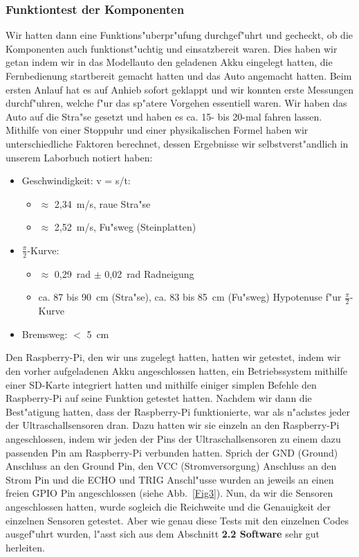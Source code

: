 \documentclass[a4paper,12pt]{article}
\newenvironment{smallitemize}{
	\begin{itemize}
		\setlength{\itemsep}{0pt}
		\setlength{\parskip}{0pt}
		\setlength{\parsep}{0pt}
}
{
	\end{itemize}
}
\begin{document}
\subsubsection{Funktiontest der Komponenten}\label{sec2.1.2}

Wir hatten dann eine Funktions"uberpr"ufung durchgef"uhrt und gecheckt, ob die Komponenten auch funktionst"uchtig und einsatzbereit waren.
Dies haben wir getan indem wir in das Modellauto den geladenen Akku eingelegt hatten, die Fernbedienung startbereit gemacht hatten und das Auto angemacht hatten.
Beim ersten Anlauf hat es auf Anhieb sofort geklappt und wir konnten erste Messungen durchf"uhren, welche f"ur das sp"atere Vorgehen essentiell waren.
Wir haben das Auto auf die Stra"se gesetzt und haben es ca. 15- bis 20-mal fahren lassen.
Mithilfe von einer Stoppuhr und einer physikalischen Formel haben wir unterschiedliche Faktoren berechnet, dessen Ergebnisse wir selbstverst"andlich in unserem Laborbuch notiert haben:

\begin{smallitemize}
	\item Geschwindigkeit: v = s/t:
	\begin{smallitemize}
		\item $ \approx $ 2,34~m/s, raue Stra"se
		\item $ \approx $ 2,52~m/s, Fu"sweg (Steinplatten)
	\end{smallitemize}
	\item $ \frac{\pi}{2} $-Kurve:
	\begin{smallitemize}
		\item $ \approx $ 0,29~rad $ \pm $ 0,02~rad Radneigung
		\item ca. 87 bis 90~cm (Stra"se), ca. 83 bis 85~cm (Fu"sweg) Hypotenuse f"ur $ \frac{\pi}{2} $-Kurve
	\end{smallitemize}
	\item Bremsweg: $ < $ 5~cm
\end{smallitemize}

Den Raspberry-Pi, den wir uns zugelegt hatten, hatten wir getestet, indem wir den vorher aufgeladenen Akku angeschlossen hatten, ein Betriebssystem mithilfe einer SD-Karte integriert hatten und mithilfe einiger simplen Befehle den Raspberry-Pi auf seine Funktion getestet hatten. 
Nachdem wir dann die Best"atigung hatten, dass der Raspberry-Pi funktionierte, war als n"achstes jeder der Ultraschallsensoren dran.
Dazu hatten wir sie einzeln an den Raspberry-Pi angeschlossen, indem wir jeden der Pins der Ultraschallsensoren zu einem dazu passenden Pin am Raspberry-Pi verbunden hatten.
Sprich der GND (Ground) Anschluss an den Ground Pin, den VCC (Stromversorgung) Anschluss an den Strom Pin und die ECHO und TRIG Anschl"usse wurden an jeweils an einen freien GPIO Pin angeschlossen (siehe Abb.~\ref{Fig3}).
Nun, da wir die Sensoren angeschlossen hatten, wurde sogleich die Reichweite und die Genauigkeit der einzelnen Sensoren getestet.
Aber wie genau diese Tests mit den einzelnen Codes ausgef"uhrt wurden, l"asst sich aus dem Abschnitt {\bf 2.2 Software} sehr gut herleiten.
\end{document}
